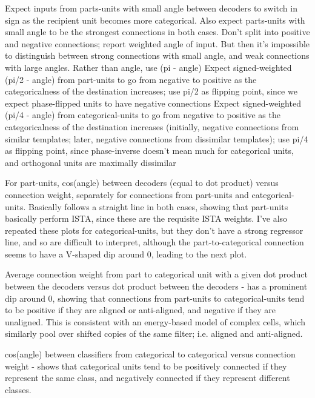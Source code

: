 Expect inputs from parts-units with small angle between decoders to switch in sign as the recipient unit becomes more categorical.  Also expect parts-units with small angle to be the strongest connections in both cases.  Don't split into positive and negative connections; report weighted angle of input.  But then it's impossible to distinguish between strong connections with small angle, and weak connections with large angles.  Rather than angle, use (pi - angle)
Expect signed-weighted (pi/2 - angle) from part-units to go from negative to positive as the categoricalness of the destination increases; use pi/2 as flipping point, since we expect phase-flipped units to have negative connections
Expect signed-weighted (pi/4 - angle) from categorical-units to go from negative to positive as the categoricalness of the destination increases (initially, negative connections from similar templates; later, negative connections from dissimilar templates); use pi/4 as flipping point, since phase-inverse doesn't mean much for categorical units, and orthogonal units are maximally dissimilar

For part-units, cos(angle) between decoders (equal to dot product) versus connection weight, separately for connections from part-units and categorical-units.  Basically follows a straight line in both cases, showing that part-units basically perform ISTA, since these are the requisite ISTA weights.  I've also repeated these plots for categorical-units, but they don't have a strong regressor line, and so are difficult to interpret, although the part-to-categorical connection seems to have a V-shaped dip around 0, leading to the next plot.

Average connection weight from part to categorical unit with a given dot product between the decoders versus dot product between the decoders - has a prominent dip around 0, showing that connections from part-units to categorical-units tend to be positive if they are aligned or anti-aligned, and negative if they are unaligned.  This is consistent with an energy-based model of complex cells, which similarly pool over shifted copies of the same filter; i.e. aligned and anti-aligned.

cos(angle) between classifiers from categorical to categorical versus connection weight - shows that categorical units tend to be positively connected if they represent the same class, and negatively connected if they represent different classes.  

